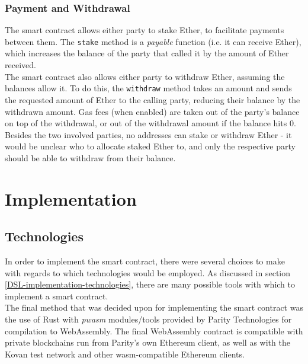 \subsubsection{Payment and Withdrawal}

The smart contract allows either party to stake Ether, to facilitate payments between them. The \texttt{stake} method is a \textit{payable} function (i.e. it can receive Ether), which increases the balance of the party that called it by the amount of Ether received. \\

The smart contract also allows either party to withdraw Ether, assuming the balances allow it. To do this, the \texttt{withdraw} method takes an amount and sends the requested amount of Ether to the calling party, reducing their balance by the withdrawn amount. Gas fees (when enabled) are taken out of the party's balance on top of the withdrawal, or out of the withdrawal amount if the balance hits 0. Besides the two involved parties, no addresses can stake or withdraw Ether - it would be unclear who to allocate staked Ether to, and only the respective party should be able to withdraw from their balance.


\section{Implementation}

\subsection{Technologies} \label{smart-contract-tech}

In order to implement the smart contract, there were several choices to make with regards to which technologies would be employed. As discussed in section \ref{DSL-implementation-technologies}, there are many possible tools with which to implement a smart contract. \\

The final method that was decided upon for implementing the smart contract was the use of Rust\cite{rust} with \textit{pwasm} modules/tools provided by Parity Technologies\cite{parity-technologies} for compilation to WebAssembly. The final WebAssembly contract is compatible with private blockchains run from Parity's own Ethereum client, as well as with the Kovan test network and other wasm-compatible Ethereum clients\cite{pwasm-tut-node}. \\

